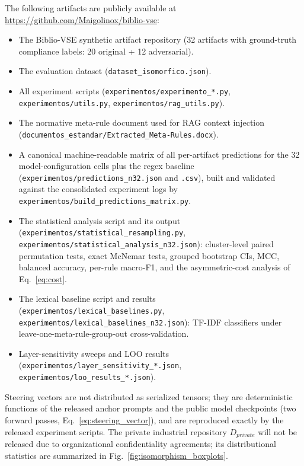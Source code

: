 \documentclass{ieeeaccess}
\begin{document}
The following artifacts are publicly available at \url{https://github.com/Maigolinox/biblio-vse}:
\begin{itemize}
    \item The Biblio-VSE synthetic artifact repository (32 artifacts with ground-truth compliance labels: 20 original + 12 adversarial).
    \item The evaluation dataset (\texttt{dataset\_isomorfico.json}).
    \item All experiment scripts (\texttt{experimentos/experimento\_*.py}, \texttt{experimentos/utils.py}, \texttt{experimentos/rag\_utils.py}).
    \item The normative meta-rule document used for RAG context injection (\texttt{documentos\_estandar/Extracted\_Meta-Rules.docx}).
    \item A canonical machine-readable matrix of all per-artifact predictions for the 32 model-configuration cells plus the regex baseline (\texttt{experimentos/predictions\_n32.json} and \texttt{.csv}), built and validated against the consolidated experiment logs by \texttt{experimentos/build\_predictions\_matrix.py}.
    \item The statistical analysis script and its output (\texttt{experimentos/statistical\_resampling.py}, \texttt{experimentos/statistical\_analysis\_n32.json}): cluster-level paired permutation tests, exact McNemar tests, grouped bootstrap CIs, MCC, balanced accuracy, per-rule macro-F1, and the asymmetric-cost analysis of Eq.~\ref{eq:cost}.
    \item The lexical baseline script and results (\texttt{experimentos/lexical\_baselines.py}, \texttt{experimentos/lexical\_baselines\_n32.json}): TF-IDF classifiers under leave-one-meta-rule-group-out cross-validation.
    \item Layer-sensitivity sweeps and LOO results (\texttt{experimentos/layer\_sensitivity\_*.json}, \texttt{experimentos/loo\_results\_*.json}).
\end{itemize}
Steering vectors are not distributed as serialized tensors; they are deterministic functions of the released anchor prompts and the public model checkpoints (two forward passes, Eq.~\ref{eq:steering_vector}), and are reproduced exactly by the released experiment scripts.
The private industrial repository $D_{private}$ will not be released due to organizational confidentiality agreements; its distributional statistics are summarized in Fig.~\ref{fig:isomorphism_boxplots}.



\end{document}
